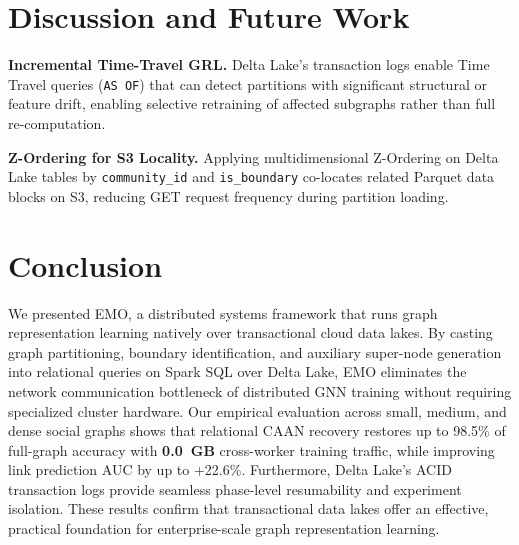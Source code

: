 \documentclass[conference,compsoc]{IEEEtran}
\begin{document}
\section{Discussion and Future Work}

\textbf{Incremental Time-Travel GRL.}
Delta Lake's transaction logs enable Time Travel queries (\verb|AS OF|) that can detect partitions with significant structural or feature drift, enabling selective retraining of affected subgraphs rather than full re-computation.

\textbf{Z-Ordering for S3 Locality.}
Applying multidimensional Z-Ordering on Delta Lake tables by \texttt{community\_id} and \texttt{is\_boundary} co-locates related Parquet data blocks on S3, reducing GET request frequency during partition loading.

\section{Conclusion}
We presented EMO, a distributed systems framework that runs graph representation learning natively over transactional cloud data lakes. By casting graph partitioning, boundary identification, and auxiliary super-node generation into relational queries on Spark SQL over Delta Lake, EMO eliminates the network communication bottleneck of distributed GNN training without requiring specialized cluster hardware. Our empirical evaluation across small, medium, and dense social graphs shows that relational CAAN recovery restores up to 98.5\% of full-graph accuracy with \textbf{0.0~GB} cross-worker training traffic, while improving link prediction AUC by up to +22.6\%. Furthermore, Delta Lake's ACID transaction logs provide seamless phase-level resumability and experiment isolation. These results confirm that transactional data lakes offer an effective, practical foundation for enterprise-scale graph representation learning.
\end{document}
